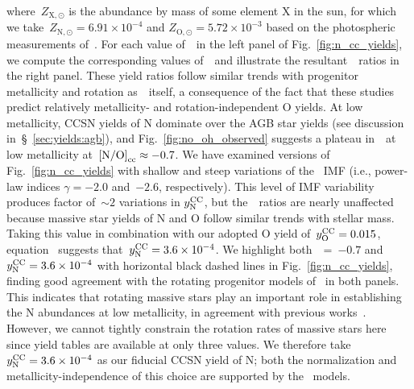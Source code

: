\documentclass[ms.tex]{subfiles}
\begin{document}
where~$Z_{\text{X},\odot}$ is the abundance by mass of some element X in the
sun, for which we take~$Z_{\text{N},\odot} = 6.91\times10^{-4}$ and
$Z_{\text{O},\odot} = 5.72\times10^{-3}$ based on the photospheric measurements
of~\citet{Asplund2009}.
For each value of~~in the left panel of Fig.~\ref{fig:n_cc_yields}, we
compute the corresponding values of~~and illustrate the
resultant~\no\subcc~ratios in the right panel.
These yield ratios follow similar trends with progenitor metallicity and
rotation as~~itself, a consequence of the fact that these
studies predict relatively metallicity- and rotation-independent O yields.
At low metallicity, CCSN yields of N dominate over the AGB star yields (see
discussion in~\S~\ref{sec:yields:agb}), and Fig.~\ref{fig:no_oh_observed}
suggests a plateau in~\no~at low metallicity at~$\text{[N/O]}_\text{cc}\approx-0.7$.
{\color{red}
We have examined versions of Fig.~\ref{fig:n_cc_yields} with shallow and steep
variations of the~\citet{Kroupa2001} IMF (i.e., power-law indices
$\gamma = -2.0$ and~$-2.6$, respectively).
This level of IMF variability produces factor of~$\sim2$ variations in
$y_\text{N}^\text{CC}$, but the~\no\subcc~ratios are nearly unaffected because massive star
yields of N and O follow similar trends with stellar mass.
}
Taking this value in combination with our adopted O yield of~$y_\text{O}^\text{CC} = 0.015$,
equation~ suggests that~$y_\text{N}^\text{CC} = 3.6\times10^{-4}$.
We highlight both~\no\subcc~=~$-0.7$ and~$y_\text{N}^\text{CC} = 3.6\times10^{-4}$ with
horizontal black dashed lines in Fig.~\ref{fig:n_cc_yields}, finding good
agreement with the rotating progenitor models of~\citet{Limongi2018} in both
panels.
This indicates that rotating massive stars play an important role in
establishing the N abundances at low metallicity, in agreement with previous
works~\citep{Chiappini2003, Chiappini2005, Chiappini2006, Kobayashi2011,
Prantzos2018, Grisoni2021}.
{\color{red}
However, we cannot tightly constrain the rotation rates of massive stars here
since yield tables are available at only three values.
}
We therefore take~$y_\text{N}^\text{CC} = 3.6\times10^{-4}$ as our fiducial CCSN yield of N;
both the normalization and metallicity-independence of this choice are
supported by the~\citet{Limongi2018} models.
\end{document}
